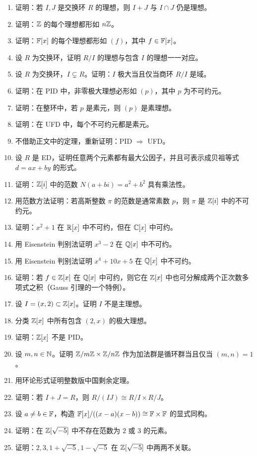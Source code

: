 \begin{enumerate}[label=\textbf{9.\arabic*}, leftmargin=*, resume]
  \item \medium 证明：若 $I,J$ 是交换环 $R$ 的理想，则 $I+J$ 与 $I\cap J$ 仍是理想。
  \item \medium 证明：$\mathbb{Z}$ 的每个理想都形如 $n\mathbb{Z}$。
  \item \medium 证明：$\mathbb{F}[x]$ 的每个理想都形如 $(f)$，其中 $f\in\mathbb{F}[x]$。
  \item \medium 设 $R$ 为交换环，证明 $R/I$ 的理想与包含 $I$ 的理想一一对应。
  \item \medium 设 $R$ 为交换环，$I\subsetneq R$。证明：$I$ 极大当且仅当商环 $R/I$ 是域。
  \item \medium 证明：在 PID 中，非零极大理想必形如 $(p)$，其中 $p$ 为不可约元。
  \item \medium 证明：在整环中，若 $p$ 是素元，则 $(p)$ 是素理想。
  \item \medium 证明：在 UFD 中，每个不可约元都是素元。
  \item \medium 不借助正文中的定理，重新证明：PID $\Rightarrow$ UFD。
  \item \medium 设 $R$ 是 ED，证明任意两个元素都有最大公因子，并且可表示成贝祖等式 $d=ax+by$ 的形式。
  \item \medium 证明：$\mathbb{Z}[i]$ 中的范数 $N(a+bi)=a^2+b^2$ 具有乘法性。
  \item \medium 用范数方法证明：若高斯整数 $\pi$ 的范数是通常素数 $p$，则 $\pi$ 是 $\mathbb{Z}[i]$ 中的不可约元。
  \item \medium 证明：$x^2+1$ 在 $\mathbb{R}[x]$ 中不可约，但在 $\mathbb{C}[x]$ 中可约。
  \item \medium 用 Eisenstein 判别法证明 $x^3-2$ 在 $\mathbb{Q}[x]$ 中不可约。
  \item \medium 用 Eisenstein 判别法证明 $x^4+10x+5$ 在 $\mathbb{Q}[x]$ 中不可约。
  \item \medium 证明：若 $f\in\mathbb{Z}[x]$ 在 $\mathbb{Q}[x]$ 中可约，则它在 $\mathbb{Z}[x]$ 中也可分解成两个正次数多项式之积（Gauss 引理的一个特例）。
  \item \medium 设 $I=(x,2)\subset \mathbb{Z}[x]$。证明 $I$ 不是主理想。
  \item \medium 分类 $\mathbb{Z}[x]$ 中所有包含 $(2,x)$ 的极大理想。
  \item \medium 证明：$\mathbb{Z}[x]$ 不是 PID。
  \item \medium 设 $m,n\in\mathbb{N}$。证明 $\mathbb{Z}/m\mathbb{Z}\times \mathbb{Z}/n\mathbb{Z}$ 作为加法群是循环群当且仅当 $(m,n)=1$。
  \item \medium 用环论形式证明整数版中国剩余定理。
  \item \medium 证明：若 $I+J=R$，则 $R/(IJ)\cong R/I\times R/J$。
  \item \medium 设 $a\neq b\in \mathbb{F}$，构造 $\mathbb{F}[x]/((x-a)(x-b))\cong \mathbb{F}\times \mathbb{F}$ 的显式同构。
  \item \medium 证明：在 $\mathbb{Z}[\sqrt{-5}]$ 中不存在范数为 $2$ 或 $3$ 的元素。
  \item \medium 证明：$2,3,1+\sqrt{-5},1-\sqrt{-5}$ 在 $\mathbb{Z}[\sqrt{-5}]$ 中两两不关联。
\end{enumerate}

